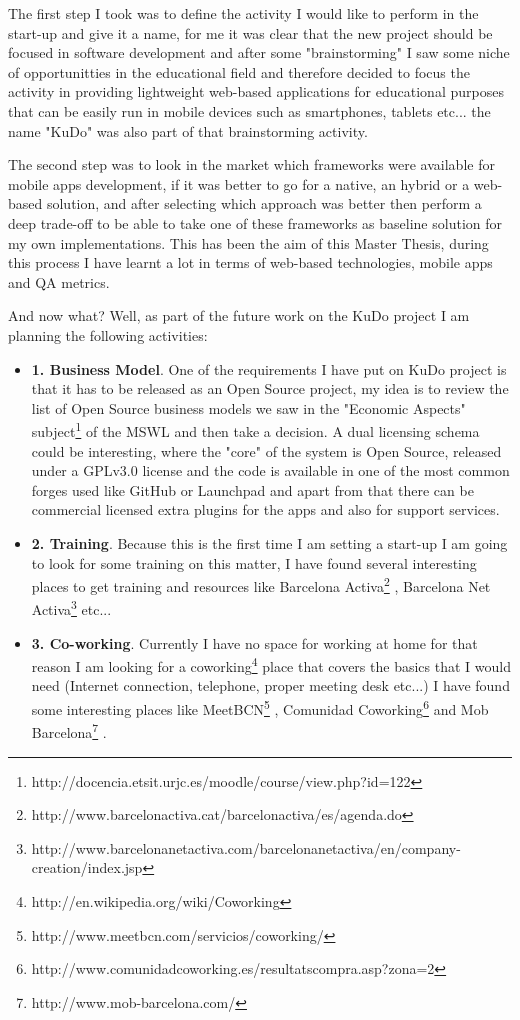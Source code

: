 \documentclass[a4paper,12pt]{book}
\begin{document}
The first step I took was to define the activity I would like to perform in the start-up  and give it a name, for me it was clear that the new project should be focused in software development and after some "brainstorming" I saw some niche of opportunitties in the educational field and therefore decided to focus the activity in providing lightweight web-based applications for educational purposes that can be easily run in mobile devices such as smartphones, tablets etc... the name "KuDo" was also part of that brainstorming activity.

\newpage

The second step was to look in the market which frameworks were available for mobile apps development, if it was better to go for a native, an hybrid or a web-based solution, and after selecting which approach was better then perform a deep trade-off to be able to take one of these frameworks as baseline solution for my own implementations. This has been the aim of this Master Thesis, during this process I have learnt a lot in terms of web-based technologies, mobile apps and QA metrics.

And now what? Well, as part of the future work on the KuDo project I am planning the following activities:

\begin{itemize}
 \item \textbf{1. Business Model}. One of the requirements I have put on KuDo project is that it has to be  released as an Open Source project, my idea is to review the list of Open Source business models we saw in the "Economic Aspects" subject\footnote{http://docencia.etsit.urjc.es/moodle/course/view.php?id=122}  of the MSWL and then take a decision. A dual licensing schema could be interesting, where the "core" of the system is Open Source, released under a GPLv3.0 license and the code is available in one of the most common forges used like GitHub or Launchpad and apart from that there can be commercial licensed extra plugins for the apps and also for support services.
 \item \textbf{2. Training}. Because this is the first time I am setting a start-up I am going to look for some training on this matter, I have found several interesting places to get training and resources like Barcelona Activa\footnote{http://www.barcelonactiva.cat/barcelonactiva/es/agenda.do} , Barcelona Net Activa\footnote{http://www.barcelonanetactiva.com/barcelonanetactiva/en/company-creation/index.jsp} etc...
 \item \textbf{3. Co-working}. Currently I have no space for working at home for that reason I am looking for a coworking\footnote{http://en.wikipedia.org/wiki/Coworking} place that covers the basics that I would need (Internet connection, telephone, proper meeting desk etc...) I have found some interesting places like MeetBCN\footnote{http://www.meetbcn.com/servicios/coworking/} , Comunidad Coworking\footnote{http://www.comunidadcoworking.es/resultatscompra.asp?zona=2}  and Mob Barcelona\footnote{http://www.mob-barcelona.com/} .
\end{itemize}
\end{document}
